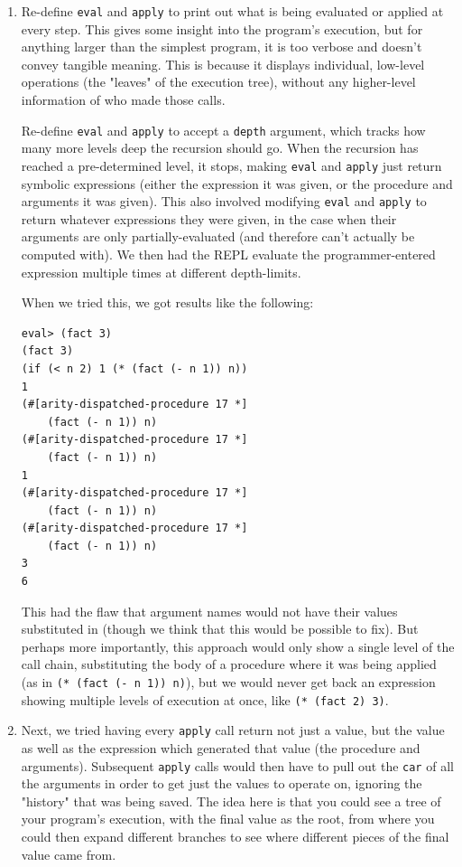\documentclass[10pt,journal,compsoc]{IEEEtran}
\begin{document}
		\begin{enumerate}
		\item Re-define \lstinline{eval} and \lstinline{apply} to print out what is being evaluated or applied at every step. This gives some insight into the program's execution, but for anything larger than the simplest program, it is too verbose and doesn't convey tangible meaning. This is because it displays individual, low-level operations (the "leaves" of the execution tree), without any higher-level information of who made those calls.

		\inew Re-define \lstinline{eval} and \lstinline{apply} to accept a \lstinline{depth} argument, which tracks how many more levels deep the recursion should go. When the recursion has reached a pre-determined level, it stops, making \lstinline{eval} and \lstinline{apply} just return symbolic expressions (either the expression it was given, or the procedure and arguments it was given). This also involved modifying \lstinline{eval} and \lstinline{apply} to return whatever expressions they were given, in the case when their arguments are only partially-evaluated (and therefore can't actually be computed with). We then had the REPL evaluate the programmer-entered expression multiple times at different depth-limits.

		When we tried this, we got results like the following:

\begin{lstlisting}[frame=single]
eval> (fact 3)
(fact 3)
(if (< n 2) 1 (* (fact (- n 1)) n))
1
(#[arity-dispatched-procedure 17 *]
    (fact (- n 1)) n)
(#[arity-dispatched-procedure 17 *]
    (fact (- n 1)) n)
1
(#[arity-dispatched-procedure 17 *]
    (fact (- n 1)) n)
(#[arity-dispatched-procedure 17 *]
    (fact (- n 1)) n)
3
6
\end{lstlisting}

This had the flaw that argument names would not have their values substituted in (though we think that this would be possible to fix). But perhaps more importantly, this approach would only show a single level of the call chain, substituting the body of a procedure where it was being applied (as in \lstinline{(* (fact (- n 1)) n)}), but we would never get back an expression showing multiple levels of execution at once, like \lstinline{(* (fact 2) 3)}.

		\item Next, we tried having every \lstinline{apply} call return not just a value, but the value as well as the expression which generated that value (the procedure and arguments). Subsequent \lstinline{apply} calls would then have to pull out the \lstinline{car} of all the arguments in order to get just the values to operate on, ignoring the "history" that was being saved. The idea here is that you could see a tree of your program's execution, with the final value as the root, from where you could then expand different branches to see where different pieces of the final value came from. 


\end{enumerate}
\end{document}
